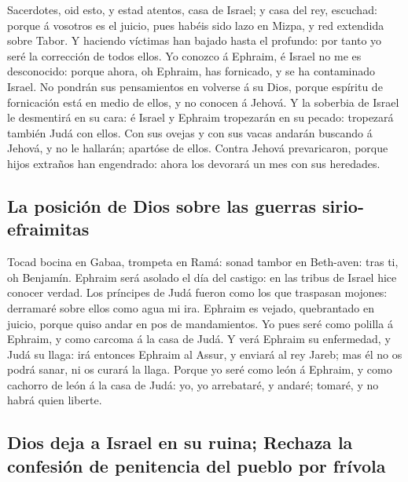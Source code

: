  Sacerdotes, oid esto, y estad atentos, casa de Israel; y
casa del rey, escuchad: porque á vosotros es el juicio, pues habéis sido
lazo en Mizpa, y red extendida sobre Tabor.  Y haciendo
víctimas han bajado hasta el profundo: por tanto yo seré la corrección
de todos ellos.  Yo conozco á Ephraim, é Israel no me es
desconocido: porque ahora, oh Ephraim, has fornicado, y se ha
contaminado Israel.  No pondrán sus pensamientos en
volverse á su Dios, porque espíritu de fornicación está en medio de
ellos, y no conocen á Jehová.  Y la soberbia de Israel le
desmentirá en su cara: é Israel y Ephraim tropezarán en su pecado:
tropezará también Judá con ellos.  Con sus ovejas y con
sus vacas andarán buscando á Jehová, y no le hallarán; apartóse de
ellos.  Contra Jehová prevaricaron, porque hijos extraños
han engendrado: ahora los devorará un mes con sus heredades.

\hypertarget{la-posiciuxf3n-de-dios-sobre-las-guerras-sirio-efraimitas}{%
\subsection{La posición de Dios sobre las guerras
sirio-efraimitas}\label{la-posiciuxf3n-de-dios-sobre-las-guerras-sirio-efraimitas}}

 Tocad bocina en Gabaa, trompeta en Ramá: sonad tambor en
Beth-aven: tras ti, oh Benjamín.  Ephraim será asolado el
día del castigo: en las tribus de Israel hice conocer verdad.
 Los príncipes de Judá fueron como los que traspasan
mojones: derramaré sobre ellos como agua mi ira.  Ephraim
es vejado, quebrantado en juicio, porque quiso andar en pos de
mandamientos.  Yo pues seré como polilla á Ephraim, y
como carcoma á la casa de Judá.  Y verá Ephraim su
enfermedad, y Judá su llaga: irá entonces Ephraim al Assur, y enviará al
rey Jareb; mas él no os podrá sanar, ni os curará la llaga.
 Porque yo seré como león á Ephraim, y como cachorro de
león á la casa de Judá: yo, yo arrebataré, y andaré; tomaré, y no habrá
quien liberte.

\hypertarget{dios-deja-a-israel-en-su-ruina-rechaza-la-confesiuxf3n-de-penitencia-del-pueblo-por-fruxedvola}{%
\subsection{Dios deja a Israel en su ruina; Rechaza la confesión de
penitencia del pueblo por
frívola}\label{dios-deja-a-israel-en-su-ruina-rechaza-la-confesiuxf3n-de-penitencia-del-pueblo-por-fruxedvola}}


